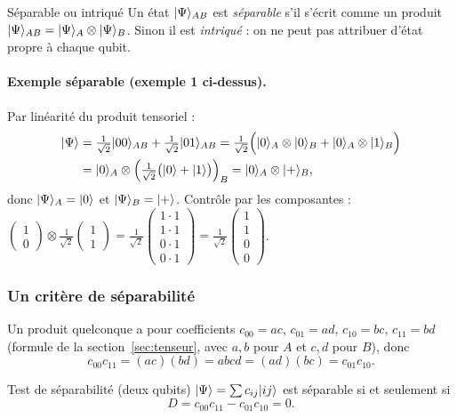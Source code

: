 \begin{definition}{Séparable ou intriqué}
Un état $|\Psi\rangle_{AB}$ est \emph{séparable} s'il s'écrit comme un produit
$|\Psi\rangle_{AB}=|\Psi\rangle_A\otimes|\Psi\rangle_B$. Sinon il est \emph{intriqué} : on ne
peut pas attribuer d'état propre à chaque qubit.
\end{definition}

\paragraph{Exemple séparable (exemple 1 ci-dessus).} Par linéarité du produit tensoriel :
\begin{align*}
  |\Psi\rangle&=\tfrac{1}{\sqrt2}|00\rangle_{AB}+\tfrac{1}{\sqrt2}|01\rangle_{AB}
    =\tfrac{1}{\sqrt2}\Big(|0\rangle_A\otimes|0\rangle_B+|0\rangle_A\otimes|1\rangle_B\Big)\\
  &=|0\rangle_A\otimes\Big(\tfrac{1}{\sqrt2}\big(|0\rangle+|1\rangle\big)\Big)_B
    =|0\rangle_A\otimes|+\rangle_B ,
\end{align*}
donc $|\Psi\rangle_A=|0\rangle$ et $|\Psi\rangle_B=|+\rangle$. Contrôle par les composantes :
$\begin{pmatrix}1\\ 0\end{pmatrix}\otimes\tfrac{1}{\sqrt2}\begin{pmatrix}1\\ 1\end{pmatrix}
=\tfrac{1}{\sqrt2}\begin{pmatrix}1\cdot1\\ 1\cdot1\\ 0\cdot1\\ 0\cdot1\end{pmatrix}
=\tfrac{1}{\sqrt2}\begin{pmatrix}1\\ 1\\ 0\\ 0\end{pmatrix}$.

\subsubsection{Un critère de séparabilité}

Un produit quelconque a pour coefficients $c_{00}=ac$, $c_{01}=ad$, $c_{10}=bc$,
$c_{11}=bd$ (formule de la section~\ref{sec:tenseur}, avec $a,b$ pour $A$ et $c,d$ pour $B$), donc
\[
  c_{00}c_{11}=(ac)(bd)=abcd=(ad)(bc)=c_{01}c_{10}.
\]

\begin{resultat}{Test de séparabilité (deux qubits)}
$|\Psi\rangle=\sum c_{ij}|ij\rangle$ est séparable si et seulement si
\[
  D=c_{00}c_{11}-c_{01}c_{10}=0 .
\]
\end{resultat}

